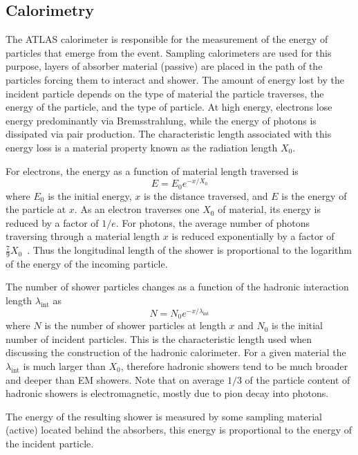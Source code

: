 \subsection{Calorimetry}
The ATLAS calorimeter is responsible for the measurement of the energy of particles that emerge from the event. Sampling calorimeters are used for this purpose, layers of absorber material (passive) are placed in the path of the particles forcing them to interact and shower. The amount of energy lost by the incident particle depends on the type of material the particle traverses, the energy of the particle, and the type of particle. At high energy, electrons lose energy predominantly via Bremsstrahlung, while the energy of photons is dissipated via pair production. The characteristic length associated with this energy loss is a material property known as the radiation length $X_0$.

For electrons, the energy as a function of material length traversed is
%
\begin{equation}
  E=E_0e^{-x/X_0}
\end{equation}
%
where $E_0$ is the initial energy, $x$ is the distance traversed, and $E$ is the energy of the particle at $x$. As an electron traverses one $X_0$ of material, its energy is reduced by a factor of $1/e$. For photons, the average number of photons traversing through a material length $x$ is reduced exponentially by a factor of $\frac{7}{9}X_0$~\cite{PhotonMaterial}. Thus the longitudinal length of the shower is proportional to the logarithm of the energy of the incoming particle.

The number of shower particles changes as a function of the hadronic interaction length $\lambda_{\textrm{int}}$ as
%
\begin{equation}
  N=N_{0}e^{-x/\lambda_{\textrm{int}}}
\end{equation}
%
where $N$ is the number of shower particles at length $x$ and $N_{0}$ is the initial number of incident particles. This is the characteristic length used when discussing the construction of the hadronic calorimeter. For a given material the $\lambda_{\textrm{int}}$ is much larger than $X_{0}$, therefore hadronic showers tend to be much broader and deeper than EM showers. Note that on average $1/3$ of the particle content of hadronic showers is electromagnetic, mostly due to pion decay into photons.

The energy of the resulting shower is measured by some sampling material (active) located behind the absorbers, this energy is proportional to the energy of the incident particle.

